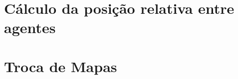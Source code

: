 \section{Cálculo da posição relativa entre agentes}
\section{Troca de Mapas}
\label{sec:seif-map-exchange}
